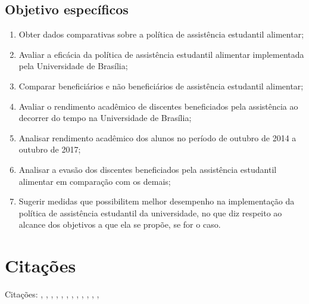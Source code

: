 \subsection{Objetivo específicos}
\begin{enumerate}
	\item Obter dados comparativas sobre a política de assistência estudantil alimentar;
	\item Avaliar a eficácia da política de assistência estudantil alimentar implementada pela Universidade de Brasília;
	\item Comparar beneficiários e não beneficiários de assistência estudantil alimentar;
	\item Avaliar o rendimento acadêmico de discentes beneficiados pela assistência ao decorrer do tempo na Universidade de Brasília; 
	\item Analisar rendimento acadêmico dos alunos no período de outubro de 2014 a outubro de 2017;
	\item Analisar a evasão dos discentes beneficiados pela assistência estudantil alimentar em comparação com os demais;
	\item Sugerir medidas que possibilitem melhor desempenho na implementação da política de assistência estudantil da universidade, no que diz respeito ao alcance dos objetivos a que ela se propõe, se for o caso.
\end{enumerate}%
\section{Citações}%
   Citações: 
   \cite{Bleicher2016PoliticasFederais},%
   \cite{MarreiroBarbosa2013DESEMPENHOHEMOGLOBINA},%
   \cite{Santos2016ASocial},%
   \cite{Machado2016DireitoUniversitarios},%
   \cite{SilvaMachadoSistemaEducation},%
   \cite{CarolinaLilideAssis2013ASBRASILEIRAS},%
   \cite{VELOSOBARBOSA2015SOBREVIVERBENEFICIARIOS/AS},%
   \cite{HARTMANNLEIBOVICH2015AvaliacaoUnB.},%
   \cite{GuedesdaSilva2017EvasaoInstitucionais.},%
   \cite{SERGIORIBEIROPINHO2017ANALISEFORTALEZA},%
   \cite{FREITASDIASPINHEIRO2015AVALIACAOEDUCACIONAL},%
   \cite{VIEIRADASILVA2016AVALIACAOUnB},%

